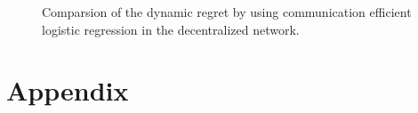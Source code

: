 \documentclass{article}
\begin{document}
\begin{figure}[!t]
\caption{Comparsion of the dynamic regret by using communication efficient logistic regression in the decentralized network.}
\label{figure_regret_communication_efficiency}
\end{figure}

















\newpage



\section*{Appendix}
\end{document}

